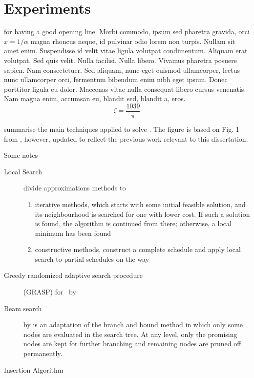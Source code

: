 

\chapter{Experiments }\label{ch:experiments} 

 for having a good opening line. Morbi commodo, ipsum sed pharetra gravida, orci  $x = 1/\alpha$ magna rhoncus neque, id pulvinar odio lorem non turpis. Nullam sit amet enim. Suspendisse id velit vitae ligula volutpat condimentum. Aliquam erat volutpat. Sed quis velit. Nulla facilisi. Nulla libero. Vivamus pharetra posuere sapien. Nam consectetuer. Sed aliquam, nunc eget euismod ullamcorper, lectus nunc ullamcorper orci, fermentum bibendum enim nibh eget ipsum. Donec porttitor ligula eu dolor. Maecenas vitae nulla consequat libero cursus venenatis. Nam magna enim, accumsan eu, blandit sed, blandit a, eros.
$$\zeta = \frac{1039}{\pi}$$

\clearpage

 summarise the main techniques applied to solve \JSP. The 
figure is based on Fig. 1 from \citet{Jain99}, however, updated to reflect the 
previous work relevant to this dissertation.

Some notes
\begin{description}
    \item[Local Search] \cite{LocalSearch} divide approximations methods to 
    \begin{enumerate}
        \item iterative methods, which starts with some initial feasible 
        solution, and its neighbourhood is searched for one with lower cost. If 
        such a solution is found, the algorithm is
        continued from there; otherwise, a local minimum has been found
        \item constructive methods, construct a complete schedule and apply 
        local search to partial schedules on the way
    \end{enumerate}
    \item[Greedy randomized adaptive search procedure] (GRASP) for \JSP\ by 
    \cite{GRASP}
    \item[Beam search] by \cite{BeamSearch} is an adaptation of the branch and 
    bound method in which only some nodes are evaluated in the search tree. At 
    any level, only the promising nodes are kept for further branching and 
    remaining nodes are pruned off permanently.
    \item[Insertion Algorithm] \cite{InsertionAlg} 
\end{description}


\clearpage


